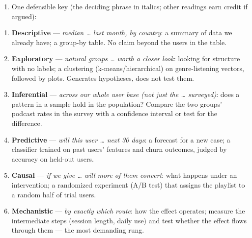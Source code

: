 \documentclass[
  11pt,
]{article}
\providecommand{\tightlist}{%
  \setlength{\itemsep}{0pt}\setlength{\parskip}{0pt}}
\begin{document}
\begin{solutionbox}

\begin{enumerate}
\def\labelenumi{(\alph{enumi})}
\tightlist
\item
  One defensible key (the deciding phrase in italics; other readings
  earn credit if argued):
\end{enumerate}

\begin{enumerate}
\def\labelenumi{\arabic{enumi}.}
\tightlist
\item
  \textbf{Descriptive} --- \emph{median \ldots{} last month, by
  country}: a summary of data we already have; a group-by table. No
  claim beyond the users in the table.
\item
  \textbf{Exploratory} --- \emph{natural groups \ldots{} worth a closer
  look}: looking for structure with no labels; a clustering
  (k-means/hierarchical) on genre-listening vectors, followed by plots.
  Generates hypotheses, does not test them.
\item
  \textbf{Inferential} --- \emph{across our whole user base (not just
  the \ldots{} surveyed)}: does a pattern in a sample hold in the
  population? Compare the two groups' podcast rates in the survey with a
  confidence interval or test for the difference.
\item
  \textbf{Predictive} --- \emph{will this user \ldots{} next 30 days}: a
  forecast for a new case; a classifier trained on past users' features
  and churn outcomes, judged by accuracy on held-out users.
\item
  \textbf{Causal} --- \emph{if we give \ldots{} will more of them
  convert}: what happens under an intervention; a randomized experiment
  (A/B test) that assigns the playlist to a random half of trial users.
\item
  \textbf{Mechanistic} --- \emph{by exactly which route}: how the effect
  operates; measure the intermediate steps (session length, daily use)
  and test whether the effect flows through them --- the most demanding
  rung.
\end{enumerate}


\end{solutionbox}
\end{document}
